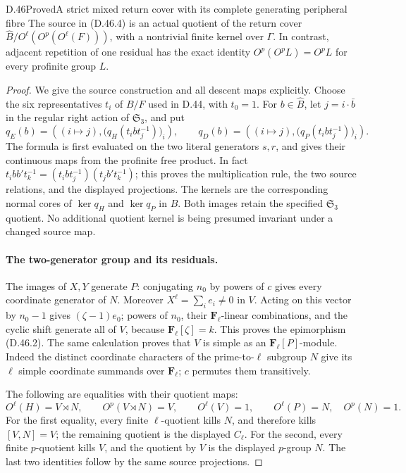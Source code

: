 \begin{statement}{D.46}{Proved}{A strict mixed return cover with its complete generating peripheral fibre}
The source in \textup{(D.46.4)} is an actual quotient of
the return cover
\(\widehat B/O^\ell(O^p(O^\ell(F)))\), with a
nontrivial finite kernel over \(\Gamma\).
In contrast, adjacent repetition of one residual has the
exact identity \(O^p(O^p L)=O^p L\) for every profinite
group \(L\).
\end{statement}

\begin{proof}
We give the source construction and all descent maps explicitly.
Choose the six representatives \(t_i\) of \(B/F\) used in
D.44, with \(t_0=1\). For \(b\in\widehat B\), let
\(j=i\cdot\bar b\) in the regular right action of
\(\mathfrak S_3\), and put
\[
 q_E(b)=\left((i\mapsto j),
           \bigl(q_H(t_i b t_j^{-1})\bigr)_i\right),
 \qquad
 q_D(b)=\left((i\mapsto j),
           \bigl(q_P(t_i b t_j^{-1})\bigr)_i\right).
 \tag{D.46.5}
\]
The formula is first evaluated on the two literal generators
\(s,r\), and gives their continuous maps from the profinite
free product. In fact
\(t_i b b' t_k^{-1}=(t_i b t_j^{-1})(t_j b't_k^{-1})\);
this proves the multiplication rule, the two source relations,
and the displayed projections. The kernels are the corresponding
normal cores of \(\ker q_H\) and \(\ker q_P\) in
\(\widehat B\). Both images retain the specified
\(\mathfrak S_3\) quotient. No additional quotient kernel
is being presumed invariant under a changed source map.

\paragraph{The two-generator group and its residuals.}
The images of \(X,Y\) generate \(P\): conjugating \(n_0\)
by powers of \(c\) gives every coordinate generator of \(N\).
Moreover \(X^\ell=\sum_i e_i\ne0\) in \(V\).
Acting on this vector by \(n_0-1\) gives
\((\zeta-1)e_0\); powers of \(n_0\), their
\(\mathbf F_\ell\)-linear combinations, and the cyclic
shift generate all of \(V\), because
\(\mathbf F_\ell[\zeta]=k\).
This proves the epimorphism \textup{(D.46.2)}.
The same calculation proves that \(V\) is simple as an
\(\mathbf F_\ell[P]\)-module. Indeed the distinct
coordinate characters of the prime-to-\(\ell\) subgroup
\(N\) give its \(\ell\) simple coordinate summands
over \(\mathbf F_\ell\); \(c\) permutes them transitively.

The following are equalities with their quotient maps:
\[
 O^\ell(H)=V\rtimes N,
 \qquad O^p(V\rtimes N)=V,
 \qquad O^\ell(V)=1,
 \qquad O^\ell(P)=N,\quad O^p(N)=1.
 \tag{D.46.6}
\]
For the first equality, every finite \(\ell\)-quotient kills
\(N\), and therefore kills \([V,N]=V\); the remaining
quotient is the displayed \(C_\ell\). For the second,
every finite \(p\)-quotient kills \(V\), and the quotient
by \(V\) is the displayed \(p\)-group \(N\).
The last two identities follow by the same source projections.


\end{proof}
